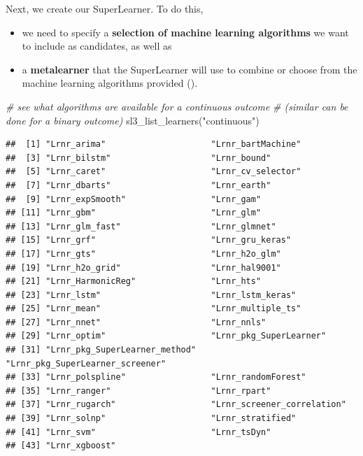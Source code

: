 \documentclass[
]{book}
\newenvironment{Shaded}{\begin{snugshade}}{\end{snugshade}}
\newcommand{\CommentTok}[1]{\textcolor[rgb]{0.56,0.35,0.01}{\textit{#1}}}
\newcommand{\FunctionTok}[1]{\textcolor[rgb]{0.00,0.00,0.00}{#1}}
\newcommand{\NormalTok}[1]{#1}
\newcommand{\StringTok}[1]{\textcolor[rgb]{0.31,0.60,0.02}{#1}}
\providecommand{\tightlist}{%
  \setlength{\itemsep}{0pt}\setlength{\parskip}{0pt}}
\begin{document}
Next, we create our SuperLearner. To do this,

\begin{itemize}
\tightlist
\item
  we need to specify a \textbf{selection of machine learning algorithms} we want to include as candidates, as well as
\item
  a \textbf{metalearner} that the SuperLearner will use to combine or choose from the machine learning algorithms provided (\citet{coyle2021tlverse}).
\end{itemize}

\begin{Shaded}
\begin{Highlighting}[]
\CommentTok{\# see what algorithms are available for a continuous outcome }
\CommentTok{\# (similar can be done for a binary outcome)}
\FunctionTok{sl3\_list\_learners}\NormalTok{(}\StringTok{"continuous"}\NormalTok{)}
\end{Highlighting}
\end{Shaded}

\begin{verbatim}
##  [1] "Lrnr_arima"                     "Lrnr_bartMachine"              
##  [3] "Lrnr_bilstm"                    "Lrnr_bound"                    
##  [5] "Lrnr_caret"                     "Lrnr_cv_selector"              
##  [7] "Lrnr_dbarts"                    "Lrnr_earth"                    
##  [9] "Lrnr_expSmooth"                 "Lrnr_gam"                      
## [11] "Lrnr_gbm"                       "Lrnr_glm"                      
## [13] "Lrnr_glm_fast"                  "Lrnr_glmnet"                   
## [15] "Lrnr_grf"                       "Lrnr_gru_keras"                
## [17] "Lrnr_gts"                       "Lrnr_h2o_glm"                  
## [19] "Lrnr_h2o_grid"                  "Lrnr_hal9001"                  
## [21] "Lrnr_HarmonicReg"               "Lrnr_hts"                      
## [23] "Lrnr_lstm"                      "Lrnr_lstm_keras"               
## [25] "Lrnr_mean"                      "Lrnr_multiple_ts"              
## [27] "Lrnr_nnet"                      "Lrnr_nnls"                     
## [29] "Lrnr_optim"                     "Lrnr_pkg_SuperLearner"         
## [31] "Lrnr_pkg_SuperLearner_method"   "Lrnr_pkg_SuperLearner_screener"
## [33] "Lrnr_polspline"                 "Lrnr_randomForest"             
## [35] "Lrnr_ranger"                    "Lrnr_rpart"                    
## [37] "Lrnr_rugarch"                   "Lrnr_screener_correlation"     
## [39] "Lrnr_solnp"                     "Lrnr_stratified"               
## [41] "Lrnr_svm"                       "Lrnr_tsDyn"                    
## [43] "Lrnr_xgboost"
\end{verbatim}
\end{document}

